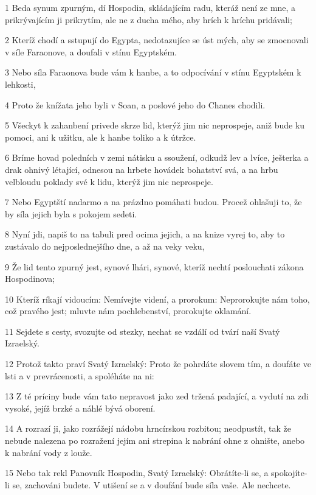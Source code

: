 \par 1 Beda synum zpurným, dí Hospodin, skládajícím radu, kteráž není ze mne, a prikrývajícím ji prikrytím, ale ne z ducha mého, aby hrích k hríchu pridávali;
\par 2 Kteríž chodí a sstupují do Egypta, nedotazujíce se úst mých, aby se zmocnovali v síle Faraonove, a doufali v stínu Egyptském.
\par 3 Nebo síla Faraonova bude vám k hanbe, a to odpocívání v stínu Egyptském k lehkosti,
\par 4 Proto že knížata jeho byli v Soan, a poslové jeho do Chanes chodili.
\par 5 Všeckyt k zahanbení privede skrze lid, kterýž jim nic neprospeje, aniž bude ku pomoci, ani k užitku, ale k hanbe toliko a k útržce.
\par 6 Bríme hovad poledních v zemi nátisku a ssoužení, odkudž lev a lvíce, ješterka a drak ohnivý létající, odnesou na hrbete hovádek bohatství svá, a na hrbu velbloudu poklady své k lidu, kterýž jim nic neprospeje.
\par 7 Nebo Egyptští nadarmo a na prázdno pomáhati budou. Procež ohlašuji to, že by síla jejich byla s pokojem sedeti.
\par 8 Nyní jdi, napiš to na tabuli pred ocima jejich, a na knize vyrej to, aby to zustávalo do nejposlednejšího dne, a až na veky veku,
\par 9 Že lid tento zpurný jest, synové lhári, synové, kteríž nechtí poslouchati zákona Hospodinova;
\par 10 Kteríž ríkají vidoucím: Nemívejte videní, a prorokum: Neprorokujte nám toho, což pravého jest; mluvte nám pochlebenství, prorokujte oklamání.
\par 11 Sejdete s cesty, svozujte od stezky, nechat se vzdálí od tvárí naší Svatý Izraelský.
\par 12 Protož takto praví Svatý Izraelský: Proto že pohrdáte slovem tím, a doufáte ve lsti a v prevrácenosti, a spoléháte na ni:
\par 13 Z té príciny bude vám tato nepravost jako zed tržená padající, a vydutí na zdi vysoké, jejíž brzké a náhlé bývá oborení.
\par 14 A rozrazí ji, jako rozrážejí nádobu hrncírskou rozbitou; neodpustít, tak že nebude nalezena po rozražení jejím ani strepina k nabrání ohne z ohnište, anebo k nabrání vody z louže.
\par 15 Nebo tak rekl Panovník Hospodin, Svatý Izraelský: Obrátíte-li se, a spokojíte-li se, zachováni budete. V utišení se a v doufání bude síla vaše. Ale nechcete.
